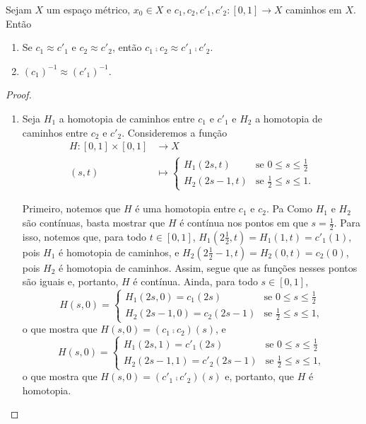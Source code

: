\begin{proposition}
\label{prop:equiv}
	Sejam $X$ um espaço métrico, $x_0 \in X$ e $c_1,c_2,c'_1,c'_2 : [0,1] \to X$ caminhos em $X$. Então
	\begin{enumerate}
	\item Se $c_1 \approx c'_1$ e $c_2 \approx c'_2$, então $c_1 \comp c_2 \approx c'_1 \comp c'_2$.
	\item $(c_1)^{-1} \approx (c'_1)^{-1}$.
	\end{enumerate}
\end{proposition}
\begin{proof}
	\begin{enumerate}
	\item Seja $H_1$ a homotopia de caminhos entre $c_1$ e $c'_1$ e $H_2$ a homotopia de caminhos entre $c_2$ e $c'_2$. Consideremos a função
	\begin{align*}
	H: [0,1] \times [0,1] &\to X \\
		(s,t) &\mapsto  \begin{cases}
								H_1(2s,t) &\text{se $0 \leq s \leq \frac{1}{2}$} \\
								H_2(2s-1,t) &\text{se $\frac{1}{2} \leq s \leq 1$}.
								\end{cases}
	\end{align*}
	
	Primeiro, notemos que $H$ é uma homotopia entre $c_1$ e $c_2$. Pa Como $H_1$ e $H_2$ são contínuas, basta mostrar que $H$ é contínua nos pontos em que $s=\frac{1}{2}$. Para isso, notemos que, para todo $t \in [0,1]$, $H_1(2\frac{1}{2},t)=H_1(1,t)=c'_1(1)$, pois $H_1$ é homotopia de caminhos, e $H_2(2\frac{1}{2}-1,t) = H_2(0,t) = c_2(0)$, pois $H_2$ é homotopia de caminhos. Assim, segue que as funções nesses pontos são iguais e, portanto, $H$ é contínua. Ainda, para todo $s \in [0,1]$,
	\begin{equation*}
	H(s,0) = \begin{cases}
						H_1(2s,0) = c_1(2s) &\text{se $0 \leq s \leq \frac{1}{2}$} \\
						H_2(2s-1,0) = c_2(2s-1) &\text{se $\frac{1}{2} \leq s \leq 1$},					\end{cases}
	\end{equation*}
o que mostra que $H(s,0)= (c_1 \comp c_2)(s)$, e
	\begin{equation*}
	H(s,0) = \begin{cases}
						H_1(2s,1) = c'_1(2s) &\text{se $0 \leq s \leq \frac{1}{2}$} \\
						H_2(2s-1,1) = c'_2(2s-1) &\text{se $\frac{1}{2} \leq s \leq 1$},					\end{cases}
	\end{equation*}
o que mostra que $H(s,0)= (c'_1 \comp c'_2)(s)$ e, portanto, que $H$ é homotopia.


\end{enumerate}
\end{proof}
